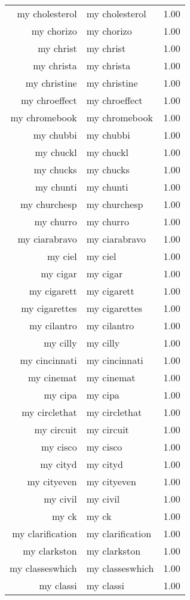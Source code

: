 \begin{table}[ht]
\begin{tabular}{rlr}
  my cholesterol & my cholesterol & 1.00 \\ 
  my chorizo & my chorizo & 1.00 \\ 
  my christ & my christ & 1.00 \\ 
  my christa & my christa & 1.00 \\ 
  my christine & my christine & 1.00 \\ 
  my chroeffect & my chroeffect & 1.00 \\ 
  my chromebook & my chromebook & 1.00 \\ 
  my chubbi & my chubbi & 1.00 \\ 
  my chuckl & my chuckl & 1.00 \\ 
  my chucks & my chucks & 1.00 \\ 
  my chunti & my chunti & 1.00 \\ 
  my churchesp & my churchesp & 1.00 \\ 
  my churro & my churro & 1.00 \\ 
  my ciarabravo & my ciarabravo & 1.00 \\ 
  my ciel & my ciel & 1.00 \\ 
  my cigar & my cigar & 1.00 \\ 
  my cigarett & my cigarett & 1.00 \\ 
  my cigarettes & my cigarettes & 1.00 \\ 
  my cilantro & my cilantro & 1.00 \\ 
  my cilly & my cilly & 1.00 \\ 
  my cincinnati & my cincinnati & 1.00 \\ 
  my cinemat & my cinemat & 1.00 \\ 
  my cipa & my cipa & 1.00 \\ 
  my circlethat & my circlethat & 1.00 \\ 
  my circuit & my circuit & 1.00 \\ 
  my cisco & my cisco & 1.00 \\ 
  my cityd & my cityd & 1.00 \\ 
  my cityeven & my cityeven & 1.00 \\ 
  my civil & my civil & 1.00 \\ 
  my ck & my ck & 1.00 \\ 
  my clarification & my clarification & 1.00 \\ 
  my clarkston & my clarkston & 1.00 \\ 
  my classeswhich & my classeswhich & 1.00 \\ 
  my classi & my classi & 1.00 \\ 

\end{tabular}
\end{table}
